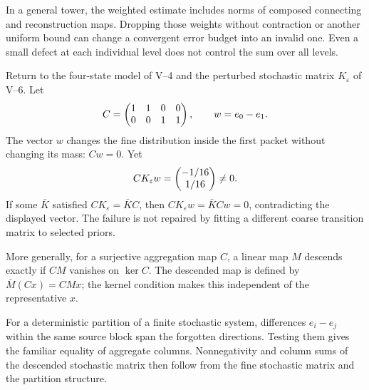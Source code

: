 In a general tower, the weighted estimate includes norms of composed connecting and reconstruction maps. Dropping those weights without contraction or another uniform bound can change a convergent error budget into an invalid one. Even a small defect at each individual level does not control the sum over all levels.

Return to the four-state model of V--4 and the perturbed stochastic matrix $K_\varepsilon$ of V--6. Let
\[
C=\begin{pmatrix}1&1&0&0\\0&0&1&1\end{pmatrix},\qquad w=e_0-e_1.
\]
The vector $w$ changes the fine distribution inside the first packet without changing its mass: $Cw=0$. Yet
\[
CK_\varepsilon w=\begin{pmatrix}-1/16\\1/16\end{pmatrix}\ne0.
\]
If some $\bar K$ satisfied $CK_\varepsilon=\bar KC$, then $CK_\varepsilon w=\bar KCw=0$, contradicting the displayed vector. The failure is not repaired by fitting a different coarse transition matrix to selected priors.

More generally, for a surjective aggregation map $C$, a linear map $M$ descends exactly if $CM$ vanishes on $\ker C$. The descended map is defined by $\bar M(Cx)=CMx$; the kernel condition makes this independent of the representative $x$.

For a deterministic partition of a finite stochastic system, differences $e_i-e_j$ within the same source block span the forgotten directions. Testing them gives the familiar equality of aggregate columns. Nonnegativity and column sums of the descended stochastic matrix then follow from the fine stochastic matrix and the partition structure.

